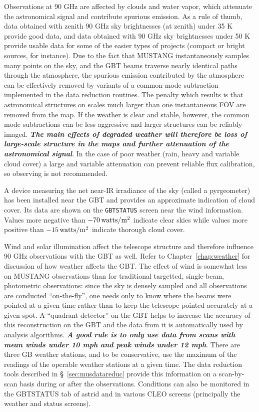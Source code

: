 Observations at 90 GHz are affected by clouds and water vapor, which
attenuate the astronomical signal and contribute spurious emission.
As a rule of thumb, data obtained with zenith 90 GHz sky brightnesses
(at zenith) under 35 K provide good data, and data obtained with 90 GHz sky
brightnesses under 50 K provide usable data for some of the easier
types of projects (compact or bright sources, for instance).  Due to
the fact that MUSTANG instantaneously samples many points on the sky,
and the GBT beams traverse nearly identical paths through the
atmosphere, the spurious emission contributed by the atmosphere can be
effectively removed by variants of a common-mode subtraction
implemented in the data reduction routines. The penalty which results
is that astronomical structures on scales much larger than one
instantaneous FOV are removed from the map. If the weather is clear
and stable, however, the common mode subtractions can be less
aggressive and larger structures can be reliably imaged. {\bf
\it The main effects of degraded weather will therefore be loss of
large-scale structure in the maps and further attenuation of the
astronomical signal}. In the case of poor weather (rain, heavy and
variable cloud cover) a large and variable attenuation can prevent
reliable flux calibration, so observing is not recommended.

A device measuring the net near-IR irradiance of the sky (called a
pyrgeometer) has been installed near the GBT and provides an approximate
indication of cloud cover. Its data are shown
on the {\tt GBTSTATUS} screen near the wind information.  Values more
negative than $-70 \, {\rm watts/m^2}$ indicate clear skies while
values more positive than $-15 \, {\rm watts/m^2}$ indicate thorough
cloud cover.

Wind and solar illumination affect the telescope structure and
therefore influence 90 GHz observations with the GBT as well.  Refer
to Chapter~\ref{chap:weather} for discussion of how weather affects
the GBT.  The effect of wind is somewhat less on MUSTANG observations
than for traditional targetted, single-beam, photometric observations:
since the sky is densely sampled and all observations are conducted
``on-the-fly'', one needs only to know where the beams were pointed at
a given time rather than to keep the telescope pointed accurately at a
given spot. A ``quadrant detector'' on the GBT helps to increase the
accuracy of this reconstruction on the GBT and the data from it is
automatically used by analysis algorithms.  {\bf \it A good rule is to
only use data from scans with mean winds under 10 mph and peak winds
under 12 mph}.  There are three GB weather stations, and to be
conservative, use the maximum of the readings of the operable weather
stations at a given time. The data reduction tools described in
\S~\ref{sec:musdatareduc} provide this information on a scan-by-scan
basis during or after the observations. Conditions can also be
monitored in the GBTSTATUS tab of astrid and in various CLEO screens
(principally the weather and status screens).

